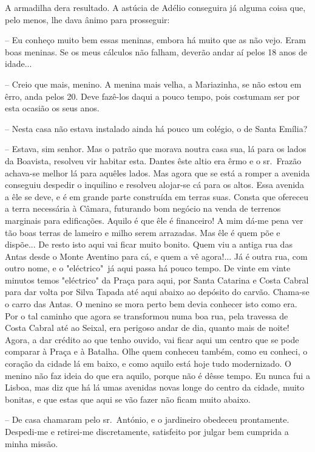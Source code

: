 \documentclass[9pt]{article}
\begin{document}
A armadi\-lha dera resultado. A astúcia de Adélio conseguira já
alguma coisa que, pelo menos, lhe dava ânimo para prosseguir:

 -- Eu conheço muito bem essas meninas, embora há muito que as não vejo. Eram boas meninas. Se os meus cálculos não
fa\-lham, deverão andar aí pelos 18 anos de idade...

-- Creio que mais, menino. A menina mais ve\-lha, a Mariazinha, se não
estou em êrro, anda pelos 20. Deve fazê-los daqui a pouco tempo, pois costumam ser por esta ocasião os seus anos.

-- Nesta casa não estava instalado ainda há pouco um colégio, o
de Santa Emília?

-- Estava, sim senhor. Mas o patrão que morava noutra casa sua, lá
para os lados da Boavista, resolveu vir habitar esta. Dantes êste
altio era êrmo e o sr.\ Frazão achava-se me\-lhor lá para a\-quê\-les lados.
Mas agora que se está a romper a avenida conseguiu despedir o inquilino e resolveu alojar-se cá para os altos. Essa avenida a êle se deve,
e é em gran\-de parte construída em terras suas. Consta que ofereceu a
terra necessária à Câmara, futurando bom negócio na venda de terrenos marginais para edifi\-ca\-ções. Aquilo é que êle é financeiro! A mim dá-me pena ver tão boas terras de lameiro e mi\-lho serem arrazadas. Mas
êle é quem põe e dispõe... De resto isto aqui vai fi\-car muito bonito.
Quem viu a antiga rua das Antas desde o Monte Aventino para cá, e quem
a vê agora!... Já é outra rua, com outro nome, e o "eléctrico"\ já aqui
passa há pouco tempo. De vinte em vinte minutos temos "eléctrico" da
Praça para aqui, por Santa Catarina e Costa Cabral para dar volta por
Silva Tapada até aqui abaixo ao depósito do carvão. Chama-se o carro
das Antas. O menino se mora perto bem devia conhecer isto como era. Por
o tal caminho que agora se transformou numa boa rua, pela travessa de
Costa Cabral até ao Seixal, era perigoso andar de dia, quanto mais de
noite! Agora, a dar crédito ao que tenho ouvido, vai fi\-car aqui um centro que se pode comparar à Praça e à Bata\-lha. O\-lhe quem conheceu também, como eu conheci, o cora\-ção da cidade lá em baixo, e como aquilo está hoje tudo modernizado. O menino não faz ideia do que era aquilo,
porque não é dêsse tempo. Eu nunca fui a Lisboa, mas diz que há lá umas
avenidas novas longe do centro da cidade, muito bonitas, e que estas
que aqui se vão fazer não fi\-cam muito abaixo.

-- De casa chamaram pelo sr.\ António, e o jardineiro obedeceu prontamente. Despedi-me e retirei-me discretamente, satisfeito por julgar
bem cumprida a minha missão.
\end{document}
